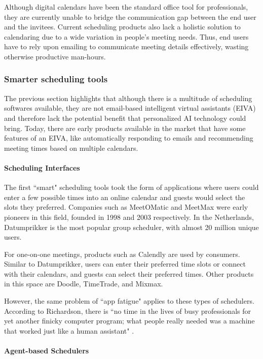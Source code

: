 \documentclass{article}
\begin{document}
Although digital calendars have been the standard office tool for professionals, they are currently unable to bridge the communication gap between the end user and the invitees. Current scheduling products also lack a holistic solution to calendaring due to a wide variation in people's meeting needs. Thus, end users have to rely upon emailing to communicate meeting details effectively, wasting otherwise productive man-hours.

\subsubsection{Smarter scheduling tools}

The previous section highlights that although there is a multitude of scheduling softwares available, they are not email-based intelligent virtual assistants (EIVA) and therefore lack the potential benefit that personalized AI technology could bring. Today, there are early products available in the market that have some features of an EIVA, like automatically responding to emails and recommending meeting times based on multiple calendars.

\paragraph{Scheduling Interfaces}

The first ``smart" scheduling tools took the form of applications where users could enter a few possible times into an online calendar and guests would select the slots they preferred. Companies such as MeetOMatic and MeetMax were early pioneers in this field, founded in 1998 and 2003 respectively. In the Netherlands, Datumprikker is the most popular group scheduler, with almost 20 million unique users.

For one-on-one meetings, products such as Calendly are used by consumers. Similar to Datumprikker, users can enter their preferred time slots or connect with their calendars, and guests can select their preferred times. Other products in this space are Doodle, TimeTrade, and Mixmax.

However, the same problem of ``app fatigue" applies to these types of schedulers. According to Richardson, there is ``no time in the lives of busy professionals for yet another finicky computer program; what people really needed was a machine that worked just like a human assistant"  \cite{noauthor_ai_nodate}.
 
 \paragraph{Agent-based Schedulers}
 
\end{document}
